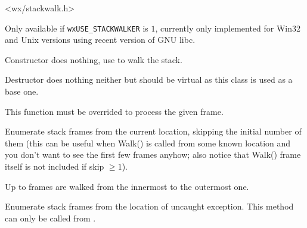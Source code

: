 
<wx/stackwalk.h>

Only available if \texttt{wxUSE\_STACKWALKER} is $1$, currently only
implemented for Win32 and Unix versions using recent version of GNU libc.






\label{wxstackwalkerwxstackwalker}


Constructor does nothing, use  to walk the
stack.


\label{wxstackwalkerdtor}


Destructor does nothing neither but should be virtual as this class is used as
a base one.


\label{wxstackwalkeronstackframe}


This function must be overrided to process the given frame.


\label{wxstackwalkerwalk}


Enumerate stack frames from the current location, skipping the initial
number of them (this can be useful when Walk() is called from some known
location and you don't want to see the first few frames anyhow; also
notice that Walk() frame itself is not included if skip $\ge 1$).

Up to  frames are walked from the innermost to the outermost one.


\label{wxstackwalkerwalkfromexception}


Enumerate stack frames from the location of uncaught exception.
This method can only be called from
.


